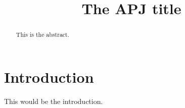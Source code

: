 \documentclass{aastex63}
\begin{document}
\title{The APJ title} 



\begin{abstract}
This is the abstract. 
\end{abstract}

\section{Introduction} \label{sec:intro}
This would be the introduction. 
\end{document}
